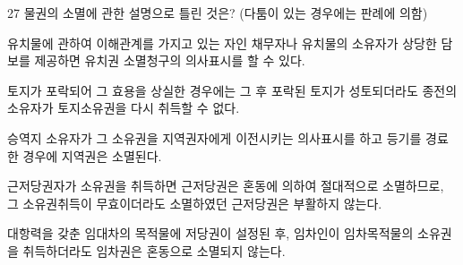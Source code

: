\begin{question}{27}
물권의 소멸에 관한 설명으로 틀린 것은? (다툼이 있는 경우에는 판례에 의함)
\begin{choices}
  \item 유치물에 관하여 이해관계를 가지고 있는 자인 채무자나 유치물의 소유자가 상당한 담보를 제공하면 유치권 소멸청구의 의사표시를 할 수 있다.
  \item 토지가 포락되어 그 효용을 상실한 경우에는 그 후 포락된 토지가 성토되더라도 종전의 소유자가 토지소유권을 다시 취득할 수 없다.
  \item 승역지 소유자가 그 소유권을 지역권자에게 이전시키는 의사표시를 하고 등기를 경료한 경우에 지역권은 소멸된다.
  \item 근저당권자가 소유권을 취득하면 근저당권은 혼동에 의하여 절대적으로 소멸하므로, 그 소유권취득이 무효이더라도 소멸하였던 근저당권은 부활하지 않는다.
  \item 대항력을 갖춘 임대차의 목적물에 저당권이 설정된 후, 임차인이 임차목적물의 소유권을 취득하더라도 임차권은 혼동으로 소멸되지 않는다.
\end{choices}
\end{question}
